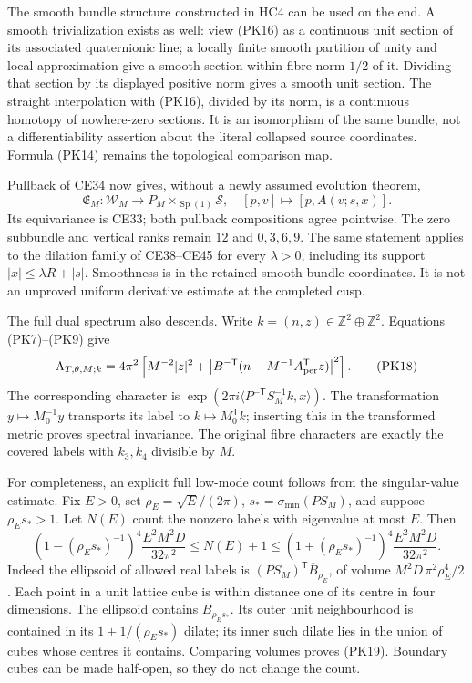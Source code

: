 \documentclass[11pt]{article}
\begin{document}
The smooth bundle structure constructed in HC4 can be used on the end.
A smooth trivialization exists as well: view (PK16) as a continuous unit
section of its associated quaternionic line; a locally finite smooth
partition of unity and local approximation give a smooth section within
fibre norm \(1/2\) of it. Dividing that section by its displayed positive
norm gives a smooth unit section. The straight interpolation with (PK16),
divided by its norm, is a continuous homotopy of nowhere-zero sections.
It is an isomorphism of the same bundle, not a differentiability assertion
about the literal collapsed source coordinates. Formula (PK14) remains
the topological comparison map.

Pullback of CE34 now gives, without a newly assumed evolution theorem,
\[
 \mathfrak E_M:\mathcal W_M\longrightarrow P_M\times_{\operatorname{Sp}(1)}\mathscr S,
 \quad [p,v]\longmapsto[p,A(v;s,x)].
 \tag{PK17}
\]
Its equivariance is CE33; both pullback compositions agree pointwise.
The zero subbundle and vertical ranks remain \(12\) and \(0,3,6,9\).
The same statement applies to the dilation family of CE38–CE45 for every
\(\lambda>0\), including its support \(|x|\le\lambda R+|s|\).
Smoothness is in the retained smooth bundle coordinates. It is not an
unproved uniform derivative estimate at the completed cusp.

The full dual spectrum also descends. Write \(k=(n,z)\in\mathbb Z^2\oplus\mathbb Z^2\).
Equations (PK7)–(PK9) give
\[
 \Lambda_{T,\theta,M;k}=4\pi^2\left[
  M^{-2}|z|^2+
  \left|B^{-\mathsf T}(n-M^{-1}A_{\rm per}^{\mathsf T}z)\right|^2\right].
 \tag{PK18}
\]
The corresponding character is
\(\exp(2\pi i\langle P^{-\mathsf T}S_M^{-1}k,x\rangle)\).
The transformation \(y\mapsto M_0^{-1}y\) transports its label to
\(k\mapsto M_0^{\mathsf T}k\); inserting this in the transformed metric
proves spectral invariance. The original fibre characters are exactly
the covered labels with \(k_3,k_4\) divisible by \(M\).

For completeness, an explicit full low-mode count follows from the
singular-value estimate. Fix \(E>0\), set
\(\rho_E=\sqrt E/(2\pi)\),
\(s_* =\sigma_{\min}(PS_M)\), and suppose \(\rho_Es_*>1\).
Let \(N(E)\) count the nonzero labels with eigenvalue at most \(E\).
Then
\[
 (1-(\rho_Es_*)^{-1})^4\frac{E^2M^2D}{32\pi^2}
 \le N(E)+1\le
 (1+(\rho_Es_*)^{-1})^4\frac{E^2M^2D}{32\pi^2}.
 \tag{PK19}
\]
Indeed the ellipsoid of allowed real labels is
\((PS_M)^{\mathsf T}\overline B_{\rho_E}\), of volume
\(M^2D\,\pi^2\rho_E^4/2\). Each point in a unit lattice cube is within
distance one of its centre in four dimensions. The ellipsoid contains
\(B_{\rho_Es_*}\). Its outer unit neighbourhood is contained in its
\(1+1/(\rho_Es_*)\) dilate; its inner such dilate lies in the union
of cubes whose centres it contains. Comparing volumes proves (PK19).
Boundary cubes can be made half-open, so they do not change the count.
\end{document}
